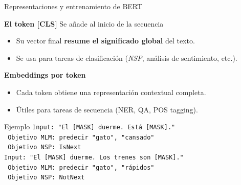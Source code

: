 \begin{frame}{Representaciones y entrenamiento de BERT}

\textbf{El token [CLS]} Se añade al inicio de la secuencia
\begin{itemize}
    \item Su vector final \textbf{resume el significado global} del texto.
    \item Se usa para tareas de clasificación (\textit{NSP}, análisis de sentimiento, etc.).
\end{itemize}

\textbf{Embeddings por token}
\begin{itemize}
    \item Cada token obtiene una representación contextual completa.
    \item Útiles para tareas de secuencia (NER, QA, POS tagging).
\end{itemize}


\begin{block}{Ejemplo}
\vspace{0.2cm}
\small
\texttt{Input: "El [MASK] duerme. Está [MASK]."}\\
\texttt{ Objetivo MLM: predecir "gato", "cansado"}\\[0.3em]
\texttt{ Objetivo NSP: IsNext}\\
\vspace{0.2cm}
\texttt{Input: "El [MASK] duerme. Los trenes son [MASK]."}\\
\texttt{ Objetivo MLM: predecir "gato", "rápidos"}\\[0.3em]
\texttt{ Objetivo NSP: NotNext}\\
\end{block}

\end{frame}



